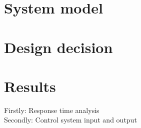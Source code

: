 \section{System model}

\section{Design decision}

\section{Results}
Firstly: Response time analysis\\
Secondly: Control system input and output










%

